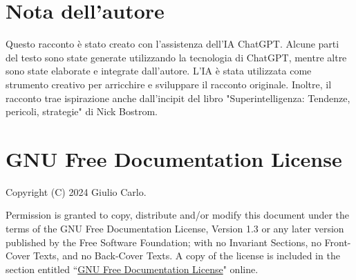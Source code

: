 \documentclass[12pt,b5paper]{article}
\begin{document}
\section*{Nota dell'autore}
Questo racconto è stato creato con l'assistenza dell'IA ChatGPT. Alcune parti
del testo sono state generate utilizzando la tecnologia di ChatGPT, mentre
altre sono state elaborate e integrate dall'autore. L'IA è stata utilizzata
come strumento creativo per arricchire e sviluppare il racconto originale.
Inoltre, il racconto trae ispirazione anche dall'incipit del libro
"Superintelligenza: Tendenze, pericoli, strategie" di Nick Bostrom.

\section*{GNU Free Documentation License}
    Copyright (C)  2024 Giulio Carlo.
   
    Permission is granted to copy, distribute and/or modify this document
    under the terms of the GNU Free Documentation License, Version 1.3
    or any later version published by the Free Software Foundation;
    with no Invariant Sections, no Front-Cover Texts, and no Back-Cover Texts.
    A copy of the license is included in the section entitled ``\href{https://www.gnu.org/licenses/fdl-1.3.en.html}{GNU Free Documentation License}"
    online.
\end{document}
